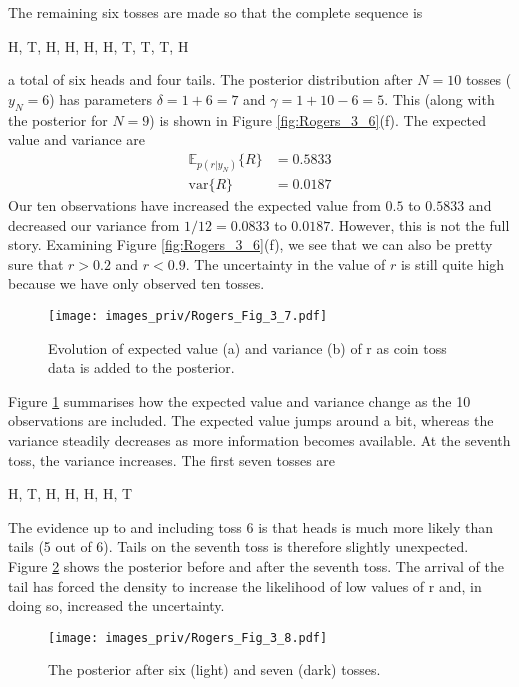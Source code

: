 The remaining six tosses are made so that the complete sequence is
\begin{textcode}
H, T, H, H, H, H, T, T, T, H
\end{textcode}
a total of six heads and four tails. The posterior distribution after $N = 10$ tosses
($y_N = 6$) has parameters $\delta = 1 + 6 = 7$ and $\gamma = 1 + 1 0 - 6 = 5$.
This (along with the posterior for $N = 9$) is shown in Figure \ref{fig:Rogers_3_6}(f).
The expected value and variance are
\begin{align*}
\mathbb{E}_{p(r|y_N)} \{ R \} & = 0.5833 \\
\mathrm{var}\{R\} & = 0.0187
\end{align*}
Our ten observations have increased the expected value from $0.5$ to $0.5833$ and
decreased our variance from $1/12 = 0.0833$ to $0.0187$. However, this is not the full
story. Examining Figure \ref{fig:Rogers_3_6}(f), we see that we can also
be pretty sure that $r > 0.2$ and $r < 0.9$.
The uncertainty in the value of $r$ is still quite high because we have
only observed ten tosses.

\begin{figure}[h]
{\centering
\texttt{[image: images\_priv/Rogers\_Fig\_3\_7.pdf]}
\par}
\caption{Evolution of expected value (a) and variance (b) of r as
coin toss data is added to the posterior.}
\label{fig:Rogers_3_7}
\end{figure}

Figure \ref{fig:Rogers_3_7} summarises how the expected value and variance change as the 10
observations are included. The expected value jumps around a bit, whereas the
variance steadily decreases as more information becomes available. At the seventh
toss, the variance increases. The first seven tosses are
\begin{textcode}
H, T, H, H, H, H, T
\end{textcode}
The evidence up to and including toss 6 is that heads is much more likely than tails
(5 out of 6). Tails on the seventh toss is therefore slightly unexpected.
Figure \ref{fig:Rogers_3_8}
shows the posterior before and after the seventh toss. The arrival of the tail has
forced the density to increase the likelihood of low values of r and, in doing so,
increased the uncertainty.

\begin{figure}[h]
{\centering
\texttt{[image: images\_priv/Rogers\_Fig\_3\_8.pdf]}
\par}
\caption{The posterior after six (light) and seven (dark) tosses.}
\label{fig:Rogers_3_8}
\end{figure}


